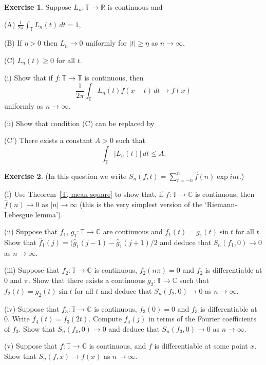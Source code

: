 \documentclass[12pt]{article}
\theoremstyle{definition}
\newtheorem{question}{Exercise}[section]
\begin{document}
\begin{question}\label{Exercise, good kernel}
Suppose $L_{n};{\mathbb T}\rightarrow{\mathbb R}$
is continuous and

(A) $\frac{1}{2\pi}\int_{\mathbb T}L_{n}(t)\, dt=1$,

(B) If $\eta>0$ then $L_{n}\rightarrow 0$ uniformly
for $|t|\geq \eta$
as $n\rightarrow\infty$,

(C) $L_{n}(t)\geq 0$ for all $t$.

(i) Show that if $f:{\mathbb T}\rightarrow{\mathbb T}$
is continuous, then
\[\frac{1}{2\pi}\int_{\mathbb T}L_{n}(t)f(x-t)\, dt\rightarrow f(x)\]
uniformly as $n\rightarrow\infty$.

(ii) Show that condition (C) can be replaced by

(C') There exists a constant $A>0$ such that
\[\int_{\mathbb T}|L_{n}(t)|\, dt\leq A.\]
\end{question}
\begin{question}
(In this question we write $S_{n}(f,t)=\sum_{r=-n}^{n}\hat{f}(n)\exp int$.)

(i) Use Theorem~\ref{T, mean square} to show that, if
$f:{\mathbb T}\rightarrow{\mathbb C}$
is continuous, then $\hat{f}(n)\rightarrow 0$
as $|n|\rightarrow\infty$ (this is the very simplest
version of the `Riemann-Lebesgue lemma').

(ii)  Suppose that $f_{1},\, g_{1}:{\mathbb T}\rightarrow{\mathbb C}$
are continuous
and $f_{1}(t)=g_{1}(t)\sin t$ for all $t$.
Show that
$\hat{f}_{1}(j)=(\hat{g}_{1}(j-1)-\hat{g}_{1}(j+1)/2$
and deduce that $S_{n}(f_{1},0)\rightarrow 0$
as $n\rightarrow\infty$.

(iii) Suppose that $f_{2}:{\mathbb T}\rightarrow{\mathbb C}$
is continuous,
$f_{2}(n\pi)=0$ and $f_{2}$ is differentiable at $0$ and $\pi$.
Show that there exists a
continuous $g_{2}:{\mathbb T}\rightarrow{\mathbb C}$
such that $f_{2}(t)=g_{2}(t)\sin t$ for all $t$
and deduce that $S_{n}(f_{2},0)\rightarrow 0$
as $n\rightarrow\infty$.

(iv) Suppose that $f_{3}:{\mathbb T}\rightarrow{\mathbb C}$
is continuous,
$f_{3}(0)=0$ and $f_{3}$ is differentiable at $0$.
Write $f_{4}(t)=f_{3}(2t)$.
Compute $\hat{f}_{4}(j)$
in terms of the Fourier coefficients of $f_{3}$.
Show that $S_{n}(f_{4},0)\rightarrow 0$
and deduce that $S_{n}(f_{3},0)\rightarrow 0$
as $n\rightarrow\infty$.

(v) Suppose that $f:{\mathbb T}\rightarrow{\mathbb C}$
is continuous,
and $f$ is differentiable at some point $x$.
Show that $S_{n}(f,x)\rightarrow f(x)$
as $n\rightarrow\infty$.
\end{question}
\end{document}
